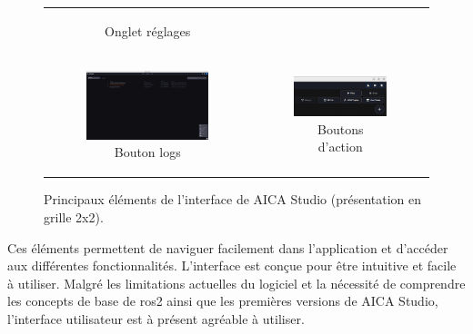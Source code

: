 \begin{figure}[H]
\begin{tabular}{cc}
\begin{subfigure}{0.45\textwidth}
            \caption{Onglet réglages}
            \label{fig:aica_rviz}
        \end{subfigure}        \\
        \addlinespace[0.5em]
        \begin{subfigure}{0.45\textwidth}
            \centering
            \includegraphics[width=0.9\linewidth]{assets/figures/AICA_logs.png}
            \caption{Bouton logs}
            \label{fig:aica_logs}
        \end{subfigure}        &
        \begin{subfigure}{0.45\textwidth}
            \centering
            \includegraphics[width=0.9\linewidth]{assets/figures/AICA_play_pause.png}
            \caption{Boutons d'action}
            \label{fig:aica_play_pause}
        \end{subfigure}
    \end{tabular}
    \caption{Principaux éléments de l'interface de AICA Studio (présentation en grille 2x2).}
    \label{fig:aica_interface_elements}
\end{figure}

Ces éléments permettent de naviguer facilement dans l'application et d'accéder aux différentes fonctionnalités. L'interface est conçue pour être intuitive et facile à utiliser. Malgré les limitations actuelles du logiciel et la nécessité de comprendre les concepts de base de \gls{ros2} ainsi que les premières versions de AICA Studio, l'interface utilisateur est à présent agréable à utiliser.

